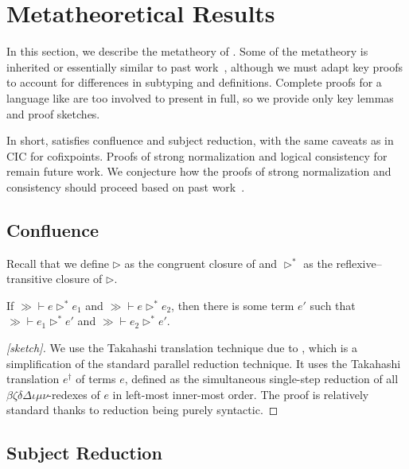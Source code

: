 \section{Metatheoretical Results}
\label{sec:metatheory}

In this section, we describe the metatheory of \lang.
Some of the metatheory is inherited or essentially similar to past work~\citep{cic-hat-minus,cc-hat-omega,cic-hat},
although we must adapt key proofs to account for differences in subtyping and definitions.
Complete proofs for a language like \lang are too involved to present in full,
so we provide only key lemmas and proof sketches.

In short, \lang satisfies confluence and subject reduction, with the same caveats as in CIC for cofixpoints.
Proofs of strong normalization and logical consistency for \lang remain future work.
We conjecture how the proofs of strong normalization and consistency should proceed based on past work~\citep{cic-hat-minus,cc-hat-omega,cic-hat}.

\subsection{Confluence}

Recall that we define $\rhd$ as the congruent closure of \reduction and $\rhd^*$ as the reflexive--transitive closure of $\rhd$.

\begin{theorem}[Confluence]
\label{thm:metatheory:confluence}
  If $\gg \vdash e \rhd^* e_1$ and $\gg \vdash e \rhd^* e_2$,
  then there is some term $e'$ such that $\gg \vdash e_1 \rhd^* e'$ and $\gg \vdash e_2 \rhd^* e'$.
\end{theorem}

\begin{proof}[{[sketch]}]
  We use the Takahashi translation technique due to \citet{takahashitrans},
  which is a simplification of the standard parallel reduction technique.
  It uses the Takahashi translation $e^\dagger$ of terms $e$,
  defined as the simultaneous single-step reduction of all
  $\beta\zeta\delta\Delta\iota\mu\nu$-redexes of $e$ in left-most inner-most order.
  The proof is relatively standard thanks to reduction being purely syntactic.
\end{proof}

\subsection{Subject Reduction}
\label{sec:meta:sub-red}

